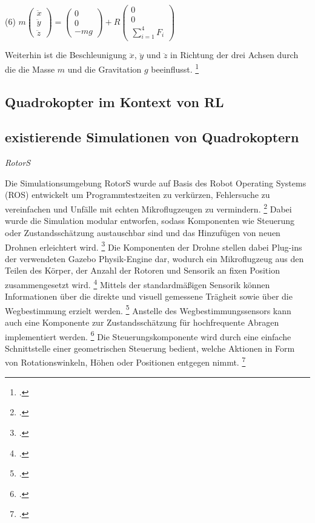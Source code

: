 \begin{description}
    \item \begin{center} (6) $m\begin{pmatrix} \ddot x \\ \ddot y \\ \ddot z \end{pmatrix} = \begin{pmatrix}0 \\ 0 \\ -mg\end{pmatrix} + R\begin{pmatrix} 0 \\ 0 \\ \sum_{i=1}^{4} F_{i} \end{pmatrix}$ \end{center}
\end{description}
Weiterhin ist die Beschleunigung $\ddot x$, $\ddot y$ und $\ddot z$ in Richtung der drei Achsen durch die die Masse $m$ und die Gravitation $g$ beeinflusst. \footcite[Vgl.][S. 3]{Deshpande.2020}

\subsection{Quadrokopter im Kontext von RL}

\subsection{existierende Simulationen von Quadrokoptern}

\textit{RotorS}

Die Simulationsumgebung RotorS wurde auf Basis des Robot Operating Systems (ROS) entwickelt um Programmtestzeiten zu verkürzen, Fehlersuche zu vereinfachen und Unfälle mit echten Mikroflugzeugen zu vermindern. \footcite[Vgl.][S. 596]{Furrer.2016}
Dabei wurde die Simulation modular entworfen, sodass Komponenten wie Steuerung oder Zustandsschätzung austauschbar sind und das Hinzufügen von neuen Drohnen erleichtert wird. \footcite[Vgl.][S. 595]{Furrer.2016}
Die Komponenten der Drohne stellen dabei Plug-ins der verwendeten Gazebo Physik-Engine dar, wodurch ein Mikroflugzeug aus den Teilen des Körper, der Anzahl der Rotoren und Sensorik an fixen Position zusammengesetzt wird. \footcite[Vgl.][S. 597]{Furrer.2016}
Mittels der standardmäßigen Sensorik können Informationen über die direkte und visuell gemessene Trägheit sowie über die Wegbestimmung erzielt werden. \footcite[Vgl.][S. 597]{Furrer.2016}
Anstelle des Wegbestimmungssensors kann auch eine Komponente zur Zustandsschätzung für hochfrequente Abragen implementiert werden. \footcite[Vgl.][S. 598]{Furrer.2016}
Die Steuerungskomponente wird durch eine einfache Schnittstelle einer geometrischen Steuerung bedient, welche Aktionen in Form von Rotationswinkeln, Höhen oder Positionen entgegen nimmt. \footcite[Vgl.][S. 598]{Furrer.2016}

